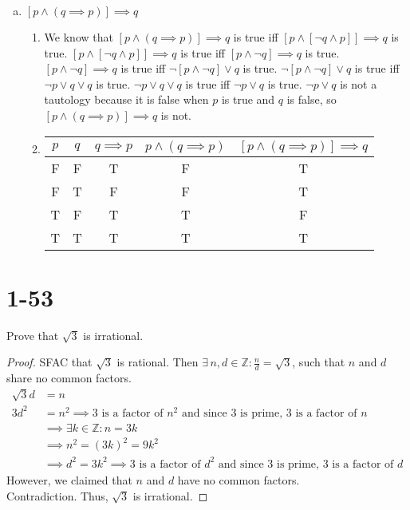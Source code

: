 \documentclass{article}
\begin{document}
\begin{enumerate}[a)]
    \item $[p \land (q \implies p)] \implies q$
        \begin{enumerate}[1)]
            \item We know that $[p \land (q \implies p)] \implies q$ is true iff
                $[p \land [\neg q \land p]] \implies q$ is true. $[p \land [\neg
                q \land p]] \implies q$ is true iff $[p \land \neg q] \implies
                q$ is true. $[p \land \neg q] \implies q$ is true iff $\neg [p
                \land \neg q] \lor q$ is true. $\neg [p \land \neg q] \lor q$ is
                true iff $\neg p \lor q \lor q$ is true. $\neg p \lor q \lor q$
                is true iff $\neg p \lor q$ is true. $\neg p \lor q$ is not a
                tautology because it is false when $p$ is true and $q$ is false,
                so $[p \land (q \implies p)] \implies q$ is not.
            \item 
                \begin{tabular}{ |c|c|c|c|c| }
                    \hline
                    $p$ & $q$ & $q \implies p$ & $p \land (q \implies p)$ & $[p \land (q \implies p)] \implies q$ \\
                    \hline
                    F & F & T & F & T \\
                    F & T & F & F & T \\
                    T & F & T & T & F \\
                    T & T & T & T & T \\
                    \hline
                \end{tabular}
        \end{enumerate}
\end{enumerate}

\section{1-53}

Prove that $\sqrt{3}$ is irrational.

\begin{proof}
    SFAC that $\sqrt{3}$ is rational.  Then $\exists \, n,d \in \mathbb{Z} :
    \frac{n}{d} = \sqrt{3}$, such that $n$ and $d$ share no common factors.
    \begin{align*}
        \sqrt{3}d &= n \\
        3d^2 &= n^2 \implies \text{$3$ is a factor of $n^2$ and since $3$ is
        prime, 3 is a factor of $n$} \\
        &\implies \exists k \in \mathbb{Z} : n = 3k \\
        &\implies n^2 = (3k)^2 = 9k^2 \\
        &\implies d^2 = 3k^2 \implies \text{$3$ is a factor of $d^2$ and since
        $3$ is prime, $3$ is a factor of $d$}
    \end{align*}
    However, we claimed that $n$ and $d$ have no common factors. \\
    Contradiction. Thus, $\sqrt{3}$ is irrational.  
\end{proof}
\end{document}
